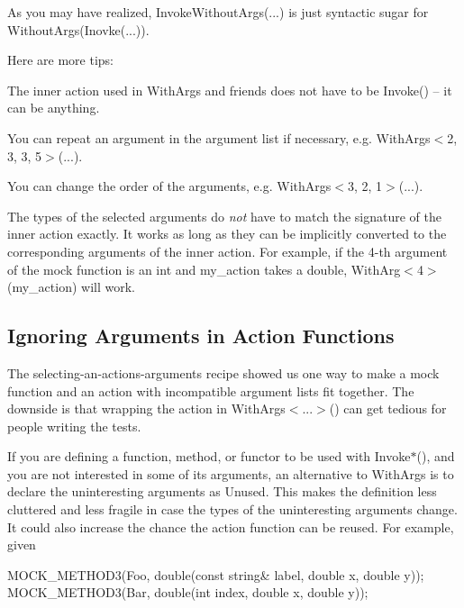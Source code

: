 As you may have realized, {\ttfamily Invoke\+Without\+Args(...)} is just syntactic sugar for {\ttfamily Without\+Args(Inovke(...))}.

Here are more tips\+:


\begin{DoxyItemize}
\item The inner action used in {\ttfamily With\+Args} and friends does not have to be {\ttfamily Invoke()} -- it can be anything.
\item You can repeat an argument in the argument list if necessary, e.\+g. {\ttfamily With\+Args$<$2, 3, 3, 5$>$(...)}.
\item You can change the order of the arguments, e.\+g. {\ttfamily With\+Args$<$3, 2, 1$>$(...)}.
\item The types of the selected arguments do {\itshape not} have to match the signature of the inner action exactly. It works as long as they can be implicitly converted to the corresponding arguments of the inner action. For example, if the 4-\/th argument of the mock function is an {\ttfamily int} and {\ttfamily my\+\_\+action} takes a {\ttfamily double}, {\ttfamily With\+Arg$<$4$>$(my\+\_\+action)} will work.
\end{DoxyItemize}

\subsection*{Ignoring Arguments in Action Functions}

The selecting-\/an-\/action\textquotesingle{}s-\/arguments recipe showed us one way to make a mock function and an action with incompatible argument lists fit together. The downside is that wrapping the action in {\ttfamily With\+Args$<$...$>$()} can get tedious for people writing the tests.

If you are defining a function, method, or functor to be used with {\ttfamily Invoke$\ast$()}, and you are not interested in some of its arguments, an alternative to {\ttfamily With\+Args} is to declare the uninteresting arguments as {\ttfamily Unused}. This makes the definition less cluttered and less fragile in case the types of the uninteresting arguments change. It could also increase the chance the action function can be reused. For example, given


\begin{DoxyCode}
MOCK\_METHOD3(Foo, double(const string& label, double x, double y));
MOCK\_METHOD3(Bar, double(int index, double x, double y));
\end{DoxyCode}


